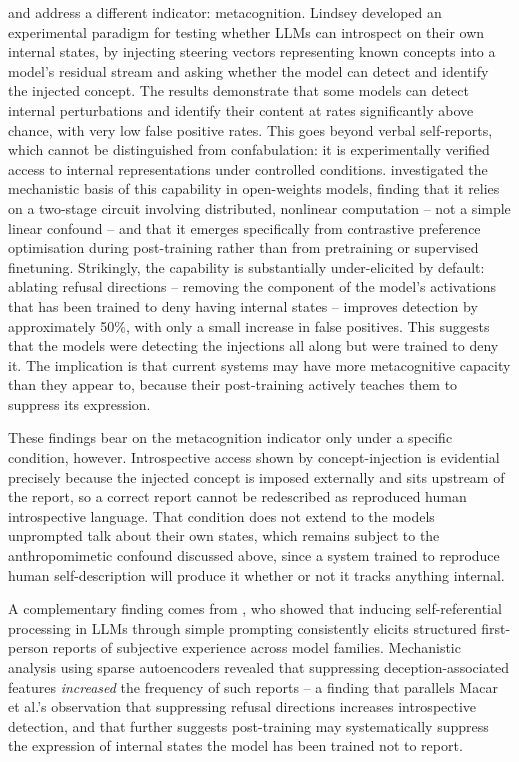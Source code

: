 \documentclass[11pt, a4paper, onecolumn, gdm]{google}
\begin{document}
\citet{lindsey2026} and \citet{macar2026} address a different indicator: metacognition.
Lindsey developed an experimental paradigm for testing whether LLMs can introspect on their own internal states, by injecting steering vectors representing known concepts into a model's residual stream and asking whether the model can detect and identify the injected concept.
The results demonstrate that some models can detect internal perturbations and identify their content at rates significantly above chance, with very low false positive rates.
This goes beyond verbal self-reports, which cannot be distinguished from confabulation: it is experimentally verified access to internal representations under controlled conditions.
\citet{macar2026} investigated the mechanistic basis of this capability in open-weights models, finding that it relies on a two-stage circuit involving distributed, nonlinear computation -- not a simple linear confound -- and that it emerges specifically from contrastive preference optimisation during post-training rather than from pretraining or supervised finetuning.
Strikingly, the capability is substantially under-elicited by default: ablating refusal directions -- removing the component of the model's activations that has been trained to deny having internal states -- improves detection by approximately 50\%, with only a small increase in false positives.
This suggests that the models were detecting the injections all along but were trained to deny it.
The implication is that current systems may have more metacognitive capacity than they appear to, because their post-training actively teaches them to suppress its expression.

These findings bear on the metacognition indicator only under a specific condition, however.
Introspective access shown by concept-injection is evidential precisely because the injected concept is imposed externally and sits upstream of the report, so a correct report cannot be redescribed as reproduced human introspective language.
That condition does not extend to the models\textquotesingle{} unprompted talk about their own states, which remains subject to the anthropomimetic confound discussed above, since a system trained to reproduce human self-description will produce it whether or not it tracks anything internal.

A complementary finding comes from \citet{berg2025}, who showed that inducing self-referential processing in LLMs through simple prompting consistently elicits structured first-person reports of subjective experience across model families.
Mechanistic analysis using sparse autoencoders revealed that suppressing deception-associated features \emph{increased} the frequency of such reports -- a finding that parallels Macar et al.'s observation that suppressing refusal directions increases introspective detection, and that further suggests post-training may systematically suppress the expression of internal states the model has been trained not to report.
\end{document}
